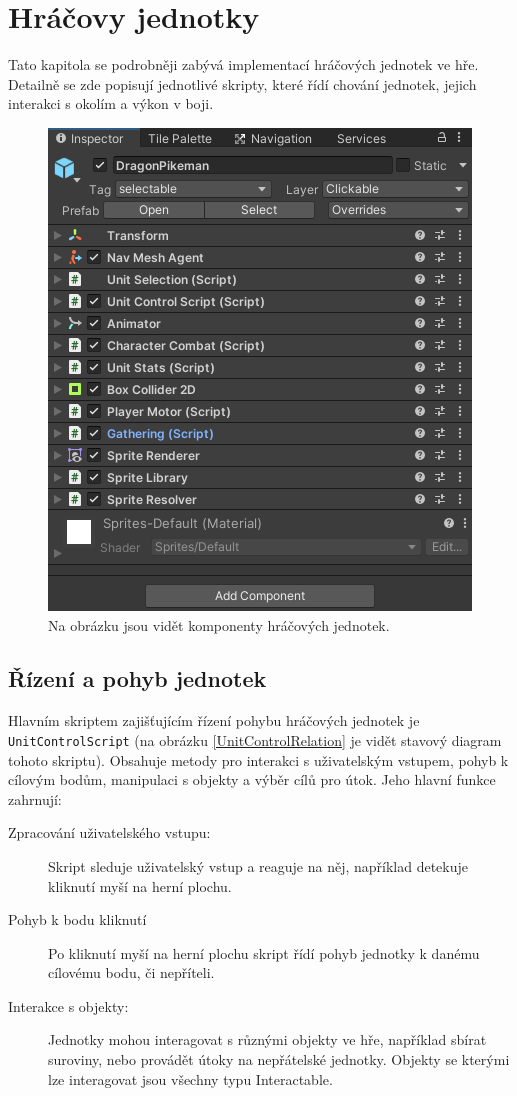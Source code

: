\section{Hráčovy jednotky}
Tato kapitola se podrobněji zabývá implementací hráčových jednotek ve hře. Detailně se zde popisují jednotlivé skripty, které řídí chování jednotek, jejich interakci s okolím a výkon v boji.

\begin{figure}[H]
	\centering
	\includegraphics[scale=1]{obrazky-figures/PlayerComponents.png}
	\caption{Na obrázku jsou vidět komponenty hráčových jednotek.}
	\label{PlayerScripts}
\end{figure}

\subsection{Řízení a pohyb jednotek}
Hlavním skriptem zajišťujícím řízení pohybu hráčových jednotek je \texttt{UnitControlScript} (na obrázku \ref{UnitControlRelation} je vidět stavový diagram tohoto skriptu). Obsahuje metody pro interakci s uživatelským vstupem, pohyb k cílovým bodům, manipulaci s objekty a výběr cílů pro útok. Jeho hlavní funkce zahrnují:

\begin{description}
	\item [Zpracování uživatelského vstupu:] Skript sleduje uživatelský vstup a reaguje na něj, například detekuje kliknutí myší na herní plochu.
	\item [Pohyb k bodu kliknutí] Po kliknutí myší na herní plochu skript řídí pohyb jednotky k danému cílovému bodu, či nepříteli.
	\item [Interakce s objekty:] Jednotky mohou interagovat s různými objekty ve hře, například sbírat suroviny, nebo provádět útoky na nepřátelské jednotky. Objekty se kterými lze interagovat jsou všechny typu Interactable.
\end{description}

